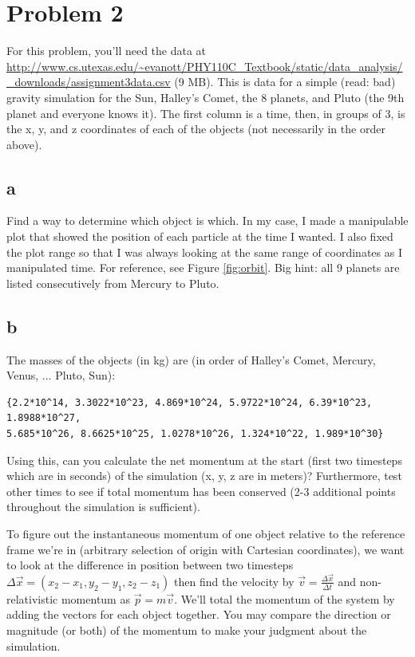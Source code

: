 \documentclass{article}
\begin{document}
\section{Problem 2}
For this problem, you'll need the data at \url{http://www.cs.utexas.edu/~evanott/PHY110C_Textbook/static/data_analysis/_downloads/assignment3data.csv} (9 MB). This is data
for a simple (read: bad) gravity simulation for the Sun, Halley's Comet, the 8 planets, and Pluto (the 9th planet and everyone knows it). The first column is a time, then, in groups
of 3, is the x, y, and z coordinates of each of the objects (not necessarily in the order above).

\subsection{a}
Find a way to determine which object is which. In my case, I made a manipulable plot that showed the position of each particle at the time I wanted. I also fixed the plot range so that
I was always looking at the same range of coordinates as I manipulated time. For reference, see Figure \ref{fig:orbit}. Big hint: all 9 planets are listed consecutively from Mercury to Pluto.

\subsection{b}
The masses of the objects (in kg) are (in order of Halley's Comet, Mercury, Venus, ... Pluto, Sun):

\begin{verbatim}
{2.2*10^14, 3.3022*10^23, 4.869*10^24, 5.9722*10^24, 6.39*10^23, 1.8988*10^27, 
5.685*10^26, 8.6625*10^25, 1.0278*10^26, 1.324*10^22, 1.989*10^30}
\end{verbatim}

Using this, can you calculate the net momentum at the start (first two timesteps which are in seconds) of the simulation (x, y, z are in meters)? Furthermore, test other times to see if total momentum has
been conserved (2-3 additional points throughout the simulation is sufficient). 

To figure out the instantaneous momentum of one object relative to the reference frame we're in (arbitrary
selection of origin with Cartesian coordinates), we want to look at the difference in position between two timesteps $\Delta{\vec{x}}=(x_2-x_1, y_2-y_1, z_2-z_1)$ then find the
velocity by $\vec{v}=\frac{\Delta{\vec{x}}}{\Delta{t}}$ and non-relativistic momentum as $\vec{p}=m\vec{v}$. We'll total the momentum of the system by adding the vectors for
each object together. You may compare the direction or magnitude (or both) of the momentum to make your judgment about the simulation.
\end{document}
